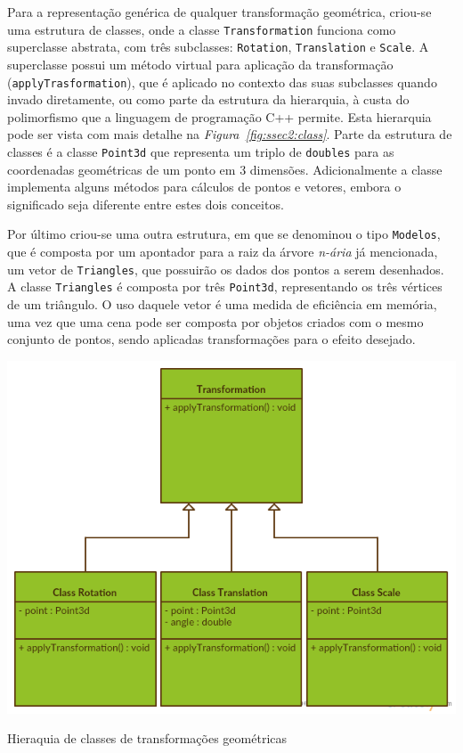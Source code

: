 Para a representação genérica de qualquer transformação geométrica, criou-se
uma estrutura de classes, onde a classe \texttt{Transformation} funciona como
superclasse abstrata, com três subclasses: \texttt{Rotation},
\texttt{Translation} e \texttt{Scale}. A superclasse possui um método virtual
para aplicação da transformação (\texttt{applyTrasformation}), que é aplicado no
contexto das suas subclasses quando invado diretamente, ou como parte da
estrutura da hierarquia, à custa do polimorfismo que a linguagem de programação
C++ permite. Esta hierarquia pode ser vista com mais detalhe na
\emph{Figura~\ref{fig:ssec2:class}}. Parte da estrutura de classes é a classe
\texttt{Point3d} que representa um triplo de \texttt{doubles} para as
coordenadas geométricas de um ponto em 3 dimensões. Adicionalmente a classe
implementa alguns métodos para cálculos de pontos e vetores, embora
o significado seja diferente entre estes dois conceitos.

Por último criou-se uma outra estrutura, em que se denominou o tipo
\texttt{Modelos}, que é composta por um apontador para a raiz da árvore
\emph{n-ária} já mencionada, um vetor de \texttt{Triangles}, que
possuirão os dados dos pontos a serem desenhados. A classe \texttt{Triangles}
é composta por três \texttt{Point3d}, representando os três vértices de um
triângulo. O uso daquele vetor é uma medida de eficiência em memória, uma vez
que uma cena pode ser composta por objetos criados com o mesmo conjunto de
pontos, sendo aplicadas transformações para o efeito desejado.

\begin{center} 	
\includegraphics[width=\textwidth,height=\textheight,keepaspectratio]{resources/classes.png}
\captionsetup{type=figure, width=0.8\linewidth}
\caption{Hieraquia de classes de transformações geométricas}
\label{fig:ssec2:class} 
\end{center}
